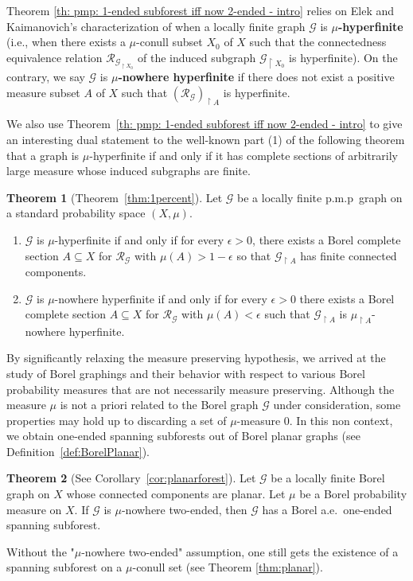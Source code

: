 \documentclass[11pt]{amsart}
\theoremstyle{definition}
\newtheorem{thmintro}{Theorem}
\theoremstyle{plain}
\newcommand{\<}{\langle}
\renewcommand{\>}{\rangle}
\newcommand{\Ggraph}{\mathcal{G}}
\newcommand{\define}[1]{\textbf{#1}}
\newcommand{\pmp}{\text{p.m.p.}}
\newcommand\RR{\mathscr{R}}
\begin{document}
Theorem \ref{th: pmp: 1-ended subforest iff now 2-ended - intro} relies on Elek and Kaimanovich's characterization of when a locally finite \pmp{} graph $\Ggraph$ is  \define{$\mu$-hyperfinite} (i.e., when there exists a $\mu$-conull subset $X_0$ of $X$ such that the connectedness equivalence relation $\RR_{\Ggraph_{\restriction{X_0}}}$ of the induced subgraph $\Ggraph_{\restriction{X_0}}$ is hyperfinite). On the contrary, we say $\Ggraph$ is \define{$\mu$-nowhere hyperfinite} if there does not exist a positive measure subset $A$ of $X$ such that $(\RR_{\Ggraph})_{\restriction A}$ is hyperfinite.


We also use Theorem~\ref{th: pmp: 1-ended subforest iff now 2-ended - intro} to give an interesting dual statement to
the well-known part (1) of the following theorem that a graph is
$\mu$-hyperfinite if and only if it has complete sections of arbitrarily large measure whose induced subgraphs are finite.
%
\begin{thmintro}[Theorem~\ref{thm:1percent}]\label{thm:lastpmp}
Let $\Ggraph$ be a locally finite p.m.p\ graph on a standard
probability space $(X,\mu )$.
\begin{enumerate}
  \item $\Ggraph$ is $\mu$-hyperfinite if and only if for
every $\epsilon > 0$, there exists a Borel complete section $A \subseteq X$ for
$\RR_\Ggraph$ with $\mu(A) > 1 - \epsilon$ so that $\Ggraph_{\restriction A}$ has
finite connected components.
  \item $\Ggraph$ is $\mu$-nowhere hyperfinite if and only if for every
  $\epsilon >0$ there exists a Borel complete section $A\subseteq X$ for
  $\RR_{\Ggraph}$ with $\mu (A)<\epsilon$ such that $\Ggraph_{\restriction A}$ is $\mu _{\restriction A}$-nowhere hyperfinite.
\end{enumerate}
\end{thmintro}


By significantly relaxing the measure preserving hypothesis, we arrived at the
study of Borel graphings and their behavior with respect to various Borel
probability measures that are not necessarily measure preserving. Although the
measure $\mu$ is not a priori related to the Borel graph $\Ggraph$ under consideration, some properties may hold up to discarding a set of $\mu$-measure $0$. In this non \pmp{} context, we obtain one-ended spanning subforests out of Borel planar graphs (see Definition~\ref{def:BorelPlanar}).
%
\begin{thmintro}[See Corollary~\ref{cor:planarforest}]
\label{th-intro: universal one-ended subforest}
Let ${\Ggraph}$ be a locally finite Borel graph on $X$ whose connected components are planar.
Let $\mu$ be a Borel probability measure on $X$. If
${\Ggraph}$ is $\mu$-nowhere two-ended, then $\Ggraph$ has a Borel a.e.\ one-ended spanning subforest.
\end{thmintro}
Without the "$\mu$-nowhere two-ended" assumption, one still gets the existence of a spanning subforest on a $\mu$-conull set (see Theorem \ref{thm:planar}).
%
\end{document}
